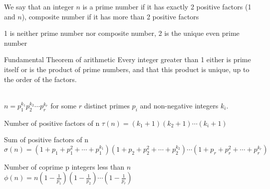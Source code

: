 
\begin{mysubsection}{}
    \begin{definition}[def:]{}
        We say that an integer $n$ is a prime number if it has exactly 2 positive factors (1 and $n$), composite number if it has more than 2 positive factors

        1 is neither prime number nor composite number, 2 is the unique even prime number
    \end{definition}

    \begin{definition}[def:]{Fundamental Theorem of arithmetic}
        Every integer greater than 1 either is prime itself or is the product of prime numbers, and that this product is unique, up to the order of the factors.
    \end{definition}

    \myframebreak

    \\
    \phantom{\qquad}$n=p_1^{k_1}p_2^{k_2}\cdots p_r^{k_r}$ for some $r$ distinct primes $p_i$ and non-negative integers $k_i$.

    \mynewpage
    \begin{definition}[def:]{Number of positive factors of n}
        $\tau (n) = (k_1 +1)(k_2+1)\cdots(k_i + 1)$
    \end{definition}

    \begin{definition}[def:]{Sum of positive factors of n}
        $\sigma (n) = (1 + p_1 + p_1^2+\cdots+p_1^{k_1})(1 + p_2 + p_2^2 + \cdots + p_2^{k_2})\cdots(1 + p_r + p_r^2 + \cdots + p_r^{k_r})$
    \end{definition}

    \begin{definition}[def:]{Number of coprime p integers less than $n$}
        $\phi (n) = n\left(1-\frac{1}{p_1}\right)\left(1-\frac{1}{p_2}\right)\cdots\left(1-\frac{1}{p_r}\right)$
    \end{definition}
\end{mysubsection}

\begin{shortque}[]{}


\end{shortque}
